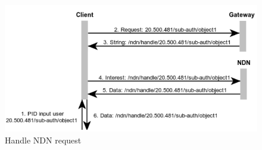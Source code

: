 
\begin{figure}[H]
\includegraphics[scale=0.75]{Images/ndn_req.png}
\caption{Handle NDN request}
\label{fig:seq_ndn}
\end{figure}